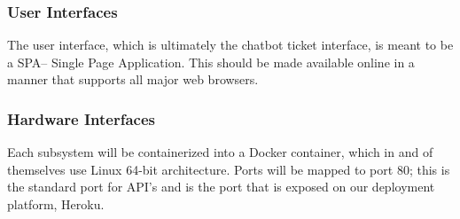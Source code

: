 \documentclass[11pt]{article}
\begin{document}
\subsubsection{User Interfaces}

The user interface, which is ultimately the chatbot ticket interface, is meant to be a SPA-- Single Page Application. This should be made available online in a manner that supports all major web browsers.


\subsubsection{Hardware Interfaces}

Each subsystem will be containerized into a Docker container, which in and of themselves use Linux 64-bit architecture. 
Ports will be mapped to port 80; this is the standard port for API's and is the port that is exposed on our deployment platform, Heroku.



\end{document}
